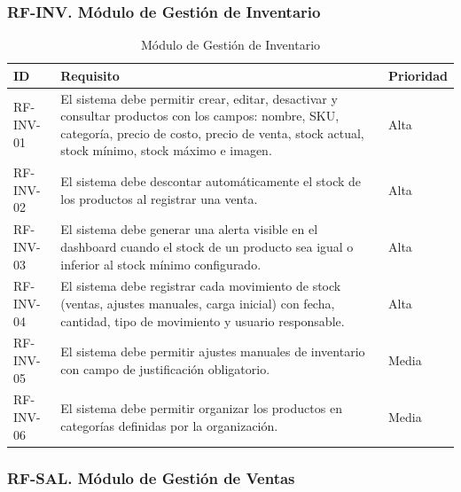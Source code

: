 \subsubsection{RF-INV. Módulo de Gestión de Inventario}\label{rf-inv.-muxf3dulo-de-gestiuxf3n-de-inventario}

\begin{longtable}[]{@{}
  >{\raggedright\arraybackslash}p{}
  >{\raggedright\arraybackslash}p{}
  >{\raggedright\arraybackslash}p{}@{}}
\caption[Módulo de Gestión de Inventario]{Módulo de Gestión de Inventario}\tabularnewline
\toprule\noalign{}
\begin{minipage}[b]{\linewidth}\raggedright
ID
\end{minipage} & \begin{minipage}[b]{\linewidth}\raggedright
Requisito
\end{minipage} & \begin{minipage}[b]{\linewidth}\raggedright
Prioridad
\end{minipage} \\
\midrule\noalign{}
\endhead
\bottomrule\noalign{}
\endlastfoot
RF-INV-01 & El sistema debe permitir crear, editar, desactivar y consultar productos con los campos: nombre, SKU, categoría, precio de costo, precio de venta, stock actual, stock mínimo, stock máximo e imagen. & Alta \\
RF-INV-02 & El sistema debe descontar automáticamente el stock de los productos al registrar una venta. & Alta \\
RF-INV-03 & El sistema debe generar una alerta visible en el dashboard cuando el stock de un producto sea igual o inferior al stock mínimo configurado. & Alta \\
RF-INV-04 & El sistema debe registrar cada movimiento de stock (ventas, ajustes manuales, carga inicial) con fecha, cantidad, tipo de movimiento y usuario responsable. & Alta \\
RF-INV-05 & El sistema debe permitir ajustes manuales de inventario con campo de justificación obligatorio. & Media \\
RF-INV-06 & El sistema debe permitir organizar los productos en categorías definidas por la organización. & Media \\
\end{longtable}

\subsubsection{RF-SAL. Módulo de Gestión de Ventas}\label{rf-sal.-muxf3dulo-de-gestiuxf3n-de-ventas}

